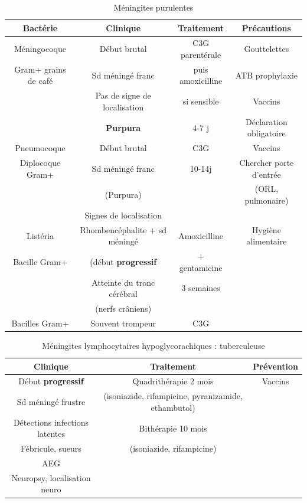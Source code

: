 \documentclass{article}
\begin{document}
\begin{table}[htpb]
  \centering
  \caption{Méningites purulentes}
  \begin{tabular}{*{4}{c}}
    \toprule
    Bactérie & Clinique & Traitement & Précautions \\
    \midrule
    Méningocoque  & Début brutal  & C3G parentérale  & Gouttelettes  \\
    Gram+ grains de café  & Sd méningé franc  & puis amoxicilline  & ATB
    prophylaxie \\
    & Pas de signe de localisation  & si sensible  & Vaccins  \\
    & \textbf{Purpura} & 4-7 j & Déclaration obligatoire \\
    \hline
    Pneumocoque  & Début brutal  & C3G  & Vaccins  \\
    Diplocoque Gram+ & Sd méningé franc  & 10-14j & Chercher porte d'entrée  \\
    & (Purpura)  & & (ORL, pulmonaire) \\
    & Signes de localisation & & \\
    \hline
    Listéria  & Rhombencéphalite + sd méningé  & Amoxicilline  & Hygiène alimentaire \\
    Bacille Gram+ & (début \textbf{progressif}  & + gentamicine  & \\
    & Atteinte du tronc cérébral  & 3 semaines & \\
    & (nerfs crâniens) & & \\
    \hline
    Bacilles Gram+ & Souvent trompeur & C3G & \\
    \bottomrule
  \end{tabular}
\end{table}

\begin{table}[htpb]
  \centering
  \caption{Méningites lymphocytaires hypoglycorachiques : tuberculeuse}
  \begin{tabular}{*{3}{c}}
    \toprule
    Clinique & Traitement & Prévention \\
    \midrule
    Début \textbf{progressif} & Quadrithérapie 2 mois & Vaccins \\
    Sd méningé frustre & (isoniazide, rifampicine, pyranizamide, ethambutol) & \\
    Détections infections latentes & Bithérapie 10 mois & \\ 
    Fébricule, sueurs &(isoniazide, rifampicine)  & \\
    AEG & & \\
    Neuropsy, localisation neuro & & \\
    \bottomrule
  \end{tabular}
\end{table}
\end{document}

